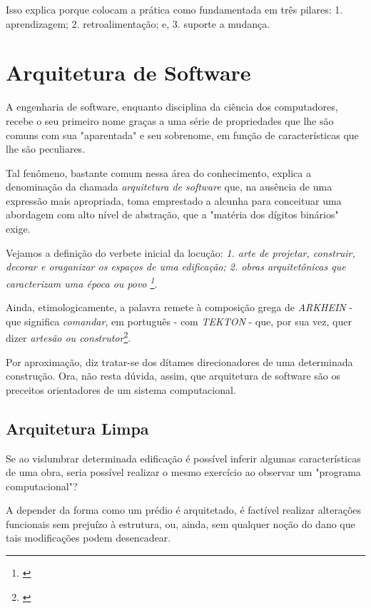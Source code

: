       Isso explica porque  colocam a prática como fundamentada em três pilares: 1. aprendizagem; 2. retroalimentação; e, 3. suporte a mudança.

  \section{Arquitetura de Software}

    A engenharia de software, enquanto disciplina da ciência dos computadores, recebe o seu primeiro nome graças a uma série de propriedades que lhe são comuns com sua "aparentada" e seu sobrenome, em função de características que lhe são peculiares.

    Tal fenômeno, bastante comum nessa área do conhecimento, explica a denominação da chamada \emph{arquitetura de software} que, na ausência de uma expressão mais apropriada, toma emprestado a alcunha para conceituar uma abordagem com alto nível de abstração, que a "matéria dos dígitos binários" exige.

    Vejamos a definição do verbete inicial da locução: \emph{1. arte de projetar, construir, decorar e oraganizar os espaços de uma edificação; 2. obras arquitetônicas que caracterizam uma época ou povo \footnote{\cite[p. 81]{Kury2007}}}.

    Ainda, etimologicamente, a palavra remete à composição grega de \emph{   ARKHEIN} - que significa \emph{comandar}, em português - com \emph{TEKTON} - que, por sua vez, quer dizer \emph{artesão ou construtor}\footnote{\cite{ Etimologia2019}}.

    Por aproximação, diz tratar-se dos dítames direcionadores de uma determinada construção. Ora, não resta dúvida, assim, que arquitetura de software são os preceitos orientadores de um sistema computacional.

    \subsection{Arquitetura Limpa}

      Se ao vislumbrar determinada edificação é possível inferir algumas características de uma obra, seria possível realizar o mesmo exercício ao observar um "programa computacional"?

      A depender da forma como um prédio é arquitetado, é factível realizar alterações funcionais sem prejuízo à estrutura, ou, ainda, sem qualquer noção do dano que tais modificações podem desencadear.

